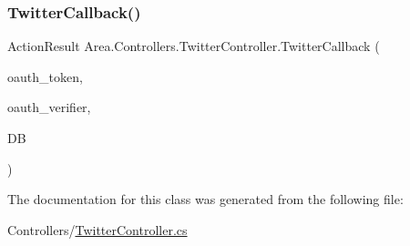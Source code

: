 \subsubsection{\texorpdfstring{Twitter\+Callback()}{TwitterCallback()}}
{\footnotesize\ttfamily Action\+Result Area.\+Controllers.\+Twitter\+Controller.\+Twitter\+Callback (\begin{DoxyParamCaption}\item[{string}]{oauth\+\_\+token,  }\item[{string}]{oauth\+\_\+verifier,  }\item[{\mbox{[}\+From\+Services\mbox{]} \mbox{\hyperlink{classArea_1_1DAT_1_1AreaDbContext}{Area\+Db\+Context}}}]{DB }\end{DoxyParamCaption})\hspace{0.3cm}{\ttfamily [inline]}}



The documentation for this class was generated from the following file\+:\begin{DoxyCompactItemize}
\item 
Controllers/\mbox{\hyperlink{TwitterController_8cs}{Twitter\+Controller.\+cs}}\end{DoxyCompactItemize}
